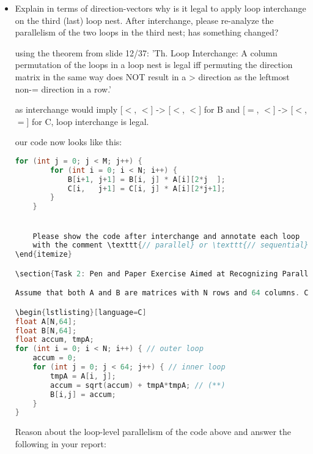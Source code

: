 \documentclass{article}
\begin{document}
\begin{itemize}
\begin{lstlisting}[language=c]
    }
    \end{lstlisting}
    

    \item Explain in terms of direction-vectors why is it legal to apply loop
   interchange on the third (last) loop nest. After interchange, please
   re-analyze the parallelism of the two loops in the third nest; has
   something changed?

    using the theorem from slide 12/37:
    'Th. Loop Interchange: A column permutation of the loops in a loop
    nest is legal iff permuting the direction matrix in the same way does
    NOT result in a > direction as the leftmost non-= direction in a row.'

    as interchange would imply [$<$, $<$] -> [$<$, $<$] for B 
    and [$=$, $<$] -> [$<$, $=$] for C, loop interchange is legal.

    our code now looks like this:

    \begin{lstlisting}[language=c]
    for (int j = 0; j < M; j++) {
        for (int i = 0; i < N; i++) {
            B[i+1, j+1] = B[i, j] * A[i][2*j  ];
            C[i,   j+1] = C[i, j] * A[i][2*j+1];
        }
    }


    Please show the code after interchange and annotate each loop
    with the comment \texttt{// parallel} or \texttt{// sequential}.
\end{itemize}

\section{Task 2: Pen and Paper Exercise Aimed at Recognizing Parallel Operators (3 pts)}

Assume that both A and B are matrices with N rows and 64 columns. Consider the pseudocode below:

\begin{lstlisting}[language=C]
float A[N,64];
float B[N,64];
float accum, tmpA;
for (int i = 0; i < N; i++) { // outer loop
    accum = 0;
    for (int j = 0; j < 64; j++) { // inner loop
        tmpA = A[i, j];
        accum = sqrt(accum) + tmpA*tmpA; // (**)
        B[i,j] = accum;
    }
}
\end{lstlisting}

Reason about the loop-level parallelism of the code above and answer the following in your report:


\end{itemize}
\end{document}
